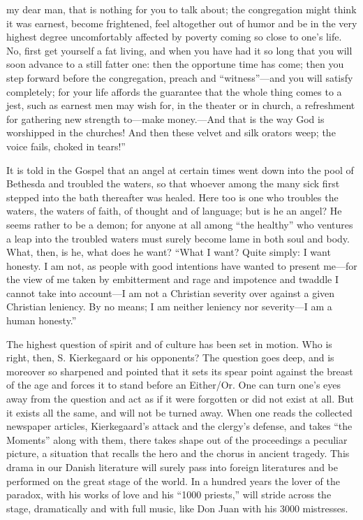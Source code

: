 \documentclass[12pt,a4paper,openany]{book}
\newcommand{\opage}[1]{\marginnote{\footnotesize\textit{[#1]}}}
\begin{document}
my dear man, that is nothing for you to talk about; the congregation might
think it was earnest, become frightened, feel altogether out of humor and
be in the very highest degree uncomfortably affected by poverty coming
so close to one's life. No, first get yourself a fat living, and when you
have had it %
so long that you will soon advance to a still fatter one: then the
opportune time has come; then you step forward before the congregation,
preach and ``witness''---and you will satisfy completely; for your life
affords the guarantee that the whole thing %
comes to a jest, such as earnest men may wish for, in the theater or in
church, a refreshment for gathering new strength to---\opage{69}make money.---And
that is the way God is worshipped in the churches! And then these velvet
and silk orators weep; the voice fails, choked in tears!''

It is told in the Gospel that an angel at certain times went down into
the pool of Bethesda and troubled the waters, so that whoever among the
many sick first stepped into the bath thereafter was healed. Here too is
one who troubles the waters, the waters of faith, of thought and of
language; but is he an angel? He seems rather to be a demon; for anyone
at all among ``the healthy'' who ventures a leap into the troubled waters
must surely become lame in both soul and body. What, then, is he, what
does he want? ``What I want? Quite simply: I want honesty. I am not, as
people with good intentions have wanted to present me---for the view of
me taken by embitterment and rage and impotence and twaddle I cannot take
into account---I am not a Christian severity over against a given
Christian leniency. By no means; I am neither leniency nor severity---I am
a human honesty.''

The highest question of spirit and of culture has been set in motion.
Who is right, then, S. Kierkegaard or his opponents? The question goes
deep, and is moreover so sharpened and pointed that it sets its spear
point against the breast of the age and forces it to stand before an
Either/Or. One can turn one's eyes away from the question and act as if
it were forgotten or did not exist at all. But it exists all the same,
and will not be turned away. When one reads the collected newspaper
articles, Kierkegaard's attack and the clergy's defense, and takes
``the Moments'' along with them, there takes shape out of the
proceedings a peculiar picture, a situation that recalls \opage{70}the hero and
the chorus in ancient tragedy. This drama in our Danish literature will
surely pass into foreign literatures and be performed on the great stage
of the world. In a hundred years the lover of the paradox, with his works
of love and his ``1000 priests,'' will stride across the stage,
dramatically and with full music, like Don Juan with his 3000 mistresses.
\end{document}
